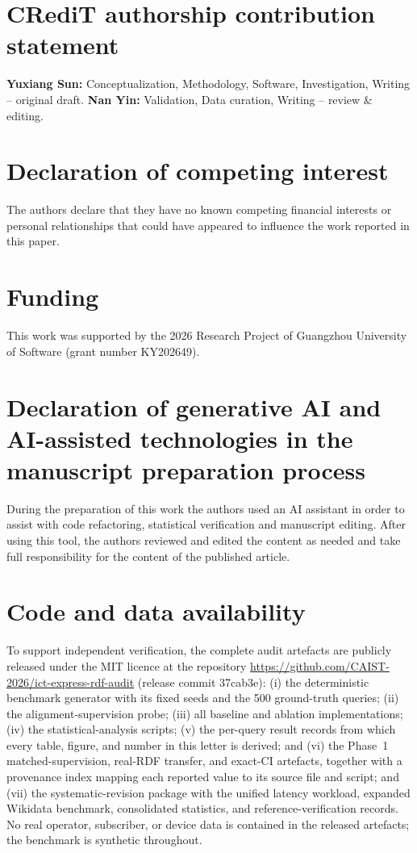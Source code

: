 \documentclass[a4paper,fleqn]{cas-dc}
\begin{document}
\section*{CRediT authorship contribution statement}
\textbf{Yuxiang Sun:} Conceptualization, Methodology, Software, Investigation,
Writing -- original draft. \textbf{Nan Yin:} Validation, Data curation,
Writing -- review \& editing.

\section*{Declaration of competing interest}
The authors declare that they have no known competing financial interests or
personal relationships that could have appeared to influence the work reported
in this paper.

\section*{Funding}
This work was supported by the 2026 Research Project of Guangzhou University
of Software (grant number KY202649).

\section*{Declaration of generative AI and AI-assisted technologies in the
manuscript preparation process}
During the preparation of this work the authors used an AI assistant in order
to assist with code refactoring, statistical verification and manuscript
editing. After using this tool, the authors reviewed and edited the content as
needed and take full responsibility for the content of the published article.

\section*{Code and data availability}
To support independent verification, the complete audit artefacts are
publicly released under the MIT licence at the repository
\url{https://github.com/CAIST-2026/ict-express-rdf-audit} (release commit
37cab3e): (i) the deterministic benchmark generator with its fixed seeds and
the 500 ground-truth queries; (ii) the alignment-supervision probe; (iii) all
baseline and ablation implementations; (iv) the statistical-analysis
scripts; (v) the per-query result records from which every table, figure,
and number in this letter is derived; and (vi) the Phase~1 matched-supervision,
real-RDF transfer, and exact-CI artefacts, together with a provenance index
mapping each reported value to its source file and script; and (vii) the
systematic-revision package with the unified latency workload, expanded
Wikidata benchmark, consolidated statistics, and reference-verification
records. No real operator,
subscriber, or device data is contained in the released artefacts; the
benchmark is synthetic throughout.
\end{document}
